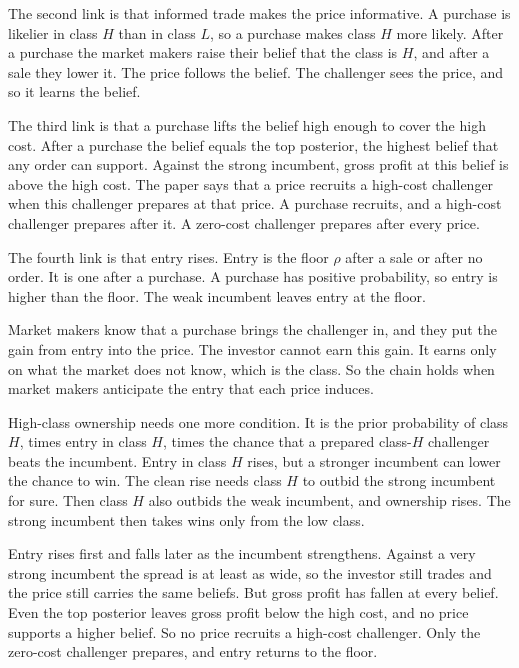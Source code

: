 The second link is that informed trade makes the price informative. A purchase is likelier in class \(H\) than in class \(L\), so a purchase makes class \(H\) more likely. After a purchase the market makers raise their belief that the class is \(H\), and after a sale they lower it. The price follows the belief. The challenger sees the price, and so it learns the belief.

The third link is that a purchase lifts the belief high enough to cover the high cost. After a purchase the belief equals the top posterior, the highest belief that any order can support. Against the strong incumbent, gross profit at this belief is above the high cost. The paper says that a price recruits a high-cost challenger when this challenger prepares at that price. A purchase recruits, and a high-cost challenger prepares after it. A zero-cost challenger prepares after every price.

The fourth link is that entry rises. Entry is the floor \(\rho\) after a sale or after no order. It is one after a purchase. A purchase has positive probability, so entry is higher than the floor. The weak incumbent leaves entry at the floor.

Market makers know that a purchase brings the challenger in, and they put the gain from entry into the price. The investor cannot earn this gain. It earns only on what the market does not know, which is the class. So the chain holds when market makers anticipate the entry that each price induces.

High-class ownership needs one more condition. It is the prior probability of class \(H\), times entry in class \(H\), times the chance that a prepared class-\(H\) challenger beats the incumbent. Entry in class \(H\) rises, but a stronger incumbent can lower the chance to win. The clean rise needs class \(H\) to outbid the strong incumbent for sure. Then class \(H\) also outbids the weak incumbent, and ownership rises. The strong incumbent then takes wins only from the low class.

Entry rises first and falls later as the incumbent strengthens. Against a very strong incumbent the spread is at least as wide, so the investor still trades and the price still carries the same beliefs. But gross profit has fallen at every belief. Even the top posterior leaves gross profit below the high cost, and no price supports a higher belief. So no price recruits a high-cost challenger. Only the zero-cost challenger prepares, and entry returns to the floor.

